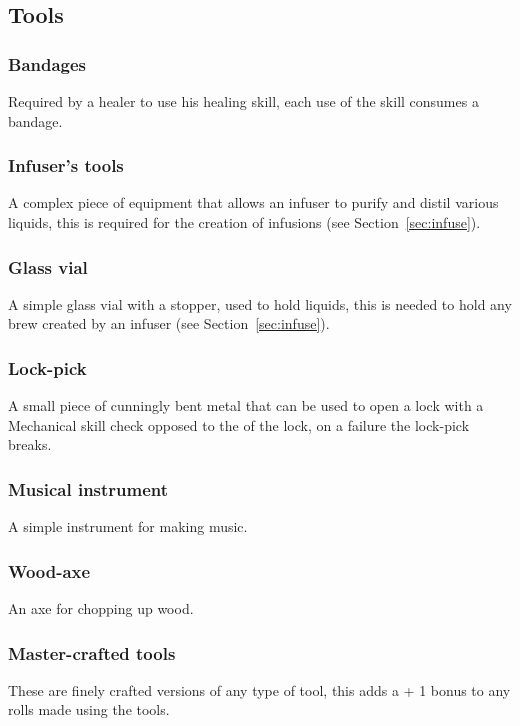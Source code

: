 \documentclass[a4paper,11pt,oneside]{book}
\newcommand{\textlf}[1]{\textbf{\titlecap{#1}}}
\begin{document}
\subsection{Tools}

\subsubsection*{Bandages}
Required by a healer to use his healing skill, each use of the skill consumes a bandage.

\subsubsection*{Infuser's tools}
A complex piece of equipment that allows an infuser to purify and distil various liquids, this is required for the creation of infusions (see Section~\ref{sec:infuse}).

\subsubsection*{Glass vial}
A simple glass vial with a stopper, used to hold liquids, this is needed to hold any brew created by an infuser (see Section~\ref{sec:infuse}).

\subsubsection*{Lock-pick}
A small piece of cunningly bent metal that can be used to open a lock with a Mechanical skill check opposed to the \textlf{difficulty} of the lock, on a failure the lock-pick breaks.

\subsubsection*{Musical instrument}
A simple instrument for making music.

\subsubsection*{Wood-axe}
An axe for chopping up wood.

\subsubsection*{Master-crafted tools}
These are finely crafted versions of any type of tool, this adds a + 1 bonus to any rolls made using the tools.
\end{document}
